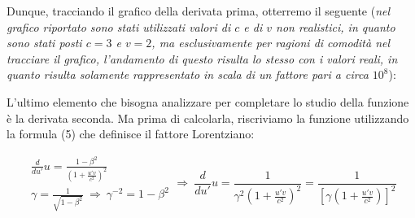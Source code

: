 \documentclass{article}
\begin{document}
Dunque, tracciando il grafico della derivata prima,
otterremo il seguente (\textit{nel grafico riportato
sono stati utilizzati valori di \(c\) e di \(v\)
non realistici, in quanto sono stati posti \(c = 3\) e \(v = 2\),
ma esclusivamente per ragioni di comodità nel tracciare
il grafico, l'andamento di questo risulta lo stesso con i
valori reali, in quanto risulta solamente rappresentato
in scala di un fattore pari a circa \(10^8\)}):

\begin{center}
\end{center}

L'ultimo elemento che bisogna analizzare per completare
lo studio della funzione è la derivata seconda. Ma prima di
calcolarla, riscriviamo la funzione utilizzando la formula (5)
che definisce il fattore Lorentziano:

\begin{equation}
    \begin{aligned}
        \frac{d}{du'} u = \frac{1 - \beta^2}{\left(1 + \frac{u'v}{c^2}\right)^2} \\
        \gamma = \frac{1}{\sqrt{1 - \beta^2}}\ \Rightarrow\ \gamma^{-2} = 1 - \beta^2
    \end{aligned}
    \Rightarrow\ \frac{d}{du'} u = \frac{1}{\gamma^2\left(1 + \frac{u'v}{c^2}\right)^2} = \frac{1}{\left[\gamma \left(1 + \frac{u'v}{c^2}\right)\right]^2}
\end{equation}
\end{document}

